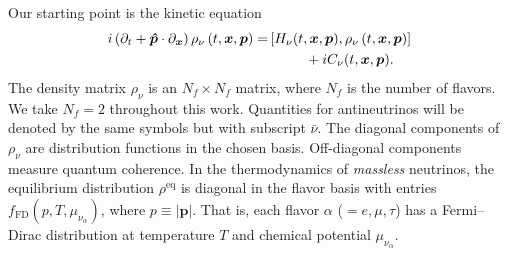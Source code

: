 \documentclass[aps,prd,twocolumn,groupedaddress,preprintnumbers]{revtex4-2}
\begin{document}
Our starting point is the kinetic equation
\begin{align}
i \left( \partial_t + \boldsymbol{\hat{p}} \cdot \partial_{\boldsymbol{x}} \right) \rho_\nu \left( t, \boldsymbol{x}, \boldsymbol{p} \right) = &\left[ H_\nu (t, \boldsymbol{x}, \boldsymbol{p} ), \rho_\nu \left( t, \boldsymbol{x}, \boldsymbol{p} \right) \right] \notag \\
&~~~~~~~~ + iC_\nu (t, \boldsymbol{x}, \boldsymbol{p}). \label{eq:qke}
\end{align}
The density matrix $\rho_\nu$ is an $N_f \times N_f$ matrix, where $N_f$ is the number of flavors. We take $N_f = 2$ throughout this work. Quantities for antineutrinos will be denoted by the same symbols but with subscript $\bar{\nu}$. The diagonal components of $\rho_\nu$ are distribution functions in the chosen basis. Off-diagonal components measure quantum coherence. In the thermodynamics of \textit{massless} neutrinos, the equilibrium distribution $\rho^\textrm{eq}$ is diagonal in the flavor basis with entries $f_\textrm{FD} (p, T, \mu_{\nu_\alpha})$, where $p \equiv |\boldsymbol{p}|$. That is, each flavor $\alpha$ ($ = e, \mu, \tau$) has a Fermi--Dirac distribution at temperature $T$ and chemical potential $\mu_{\nu_\alpha}$.
\end{document}

